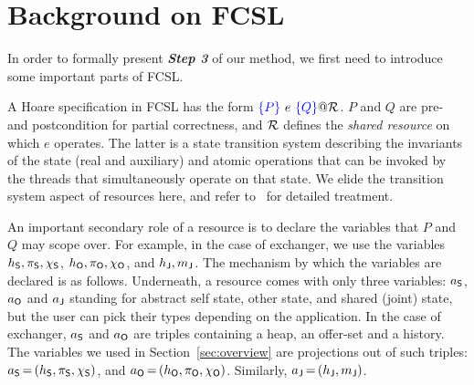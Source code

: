 \section{Background on FCSL}
\label{sec:background}

In order to formally present \textbf{\emph{Step 3}} of our method, we
first need to introduce some important parts of FCSL.

A Hoare specification in FCSL has the form $\textcolor{blue}{\left\{{P}\right\}}\ e\ \textcolor{blue}{\left\{{Q}\right\}} @
\mathcal{R}$. $P$ and $Q$ are pre- and postcondition for partial
correctness, and $\mathcal{R}$ defines the \emph{shared resource} on which
$e$ operates. 
%
%
The latter is a state transition system describing the invariants of
the state (real and auxiliary) and atomic operations that can be
invoked by the threads that simultaneously operate on that state.
%
%
We elide the transition system aspect of resources here, and refer
to~\cite{Nanevski-al:ESOP14} for detailed treatment.

An important secondary role of a resource is to declare the variables
that $P$ and $Q$ may scope over. For example, in the case of
exchanger, we use the variables $h_{\mathsf{S}}, \pi_{\mathsf{S}}, \chi_{\mathsf{S}}$, $h_{\mathsf{O}},
\pi_{\mathsf{O}}, \chi_{\mathsf{O}}$, and $h_{\mathsf{J}}, {m_{\mathsf{J}}}$.
%
The mechanism by which the variables are declared is as
follows. Underneath, a resource comes with only three variables:
$a_{\mathsf{S}}$, $a_{\mathsf{O}}$ and $a_{\mathsf{J}}$ standing for abstract self state,
other state, and shared (joint) state, but the user can pick their
types depending on the application. In the case of exchanger, $a_{\mathsf{S}}$
and $a_{\mathsf{O}}$ are triples containing a heap, an offer-set and a
history. The variables we used in Section~\ref{sec:overview} are
projections out of such triples: $a_{\mathsf{S}}\,{=}\,(h_{\mathsf{S}}, \pi_{\mathsf{S}},
\chi_{\mathsf{S}})$, and $a_{\mathsf{O}}\,{=}\,(h_{\mathsf{O}}, \pi_{\mathsf{O}}, \chi_{\mathsf{O}})$. Similarly,
$a_{\mathsf{J}}\,{=}\,(h_{\mathsf{J}}, {m_{\mathsf{J}}})$.

